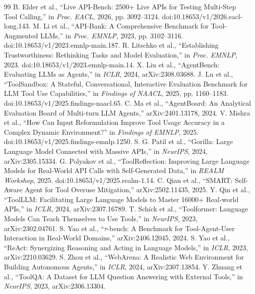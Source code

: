 \documentclass[10pt,a4paper]{article}
\begin{document}
\begin{thebibliography}{99}\small
{} B. Elder et al., ``Live API-Bench: 2500+ Live APIs for Testing Multi-Step Tool Calling,'' in \emph{Proc. EACL}, 2026, pp. 3092--3124. doi:10.18653/v1/2026.eacl-long.143.
 M. Li et al., ``API-Bank: A Comprehensive Benchmark for Tool-Augmented LLMs,'' in \emph{Proc. EMNLP}, 2023, pp. 3102--3116. doi:10.18653/v1/2023.emnlp-main.187.
 R. Litschko et al., ``Establishing Trustworthiness: Rethinking Tasks and Model Evaluation,'' in \emph{Proc. EMNLP}, 2023. doi:10.18653/v1/2023.emnlp-main.14.
 X. Liu et al., ``AgentBench: Evaluating LLMs as Agents,'' in \emph{ICLR}, 2024, arXiv:2308.03688.
 J. Lu et al., ``ToolSandbox: A Stateful, Conversational, Interactive Evaluation Benchmark for LLM Tool Use Capabilities,'' in \emph{Findings of NAACL}, 2025, pp. 1160--1183. doi:10.18653/v1/2025.findings-naacl.65.
 C. Ma et al., ``AgentBoard: An Analytical Evaluation Board of Multi-turn LLM Agents,'' arXiv:2401.13178, 2024.
 V. Mishra et al., ``How Can Input Reformulation Improve Tool Usage Accuracy in a Complex Dynamic Environment?'' in \emph{Findings of EMNLP}, 2025. doi:10.18653/v1/2025.findings-emnlp.1250.
 S. G. Patil et al., ``Gorilla: Large Language Model Connected with Massive APIs,'' in \emph{NeurIPS}, 2024, arXiv:2305.15334.
 G. Polyakov et al., ``ToolReflection: Improving Large Language Models for Real-World API Calls with Self-Generated Data,'' in \emph{REALM Workshop}, 2025. doi:10.18653/v1/2025.realm-1.14.
 C. Qian et al., ``SMART: Self-Aware Agent for Tool Overuse Mitigation,'' arXiv:2502.11435, 2025.
 Y. Qin et al., ``ToolLLM: Facilitating Large Language Models to Master 16000+ Real-world APIs,'' in \emph{ICLR}, 2024, arXiv:2307.16789.
 T. Schick et al., ``Toolformer: Language Models Can Teach Themselves to Use Tools,'' in \emph{NeurIPS}, 2023, arXiv:2302.04761.
 S. Yao et al., ``$\tau$-bench: A Benchmark for Tool-Agent-User Interaction in Real-World Domains,'' arXiv:2406.12045, 2024.
 S. Yao et al., ``ReAct: Synergizing Reasoning and Acting in Language Models,'' in \emph{ICLR}, 2023, arXiv:2210.03629.
 S. Zhou et al., ``WebArena: A Realistic Web Environment for Building Autonomous Agents,'' in \emph{ICLR}, 2024, arXiv:2307.13854.
 Y. Zhuang et al., ``ToolQA: A Dataset for LLM Question Answering with External Tools,'' in \emph{NeurIPS}, 2023, arXiv:2306.13304.
\end{thebibliography}
\end{document}
